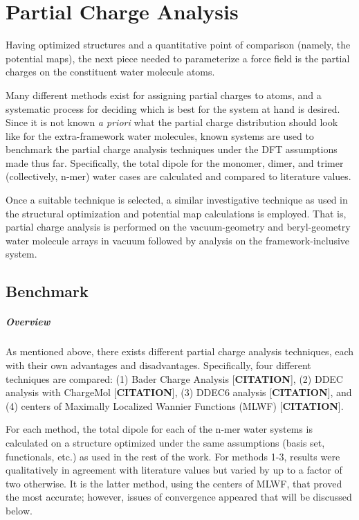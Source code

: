 \chapter{Partial Charge Analysis}
\label{ch:part_char}

Having optimized structures and a quantitative point of comparison (namely, the potential maps), the next piece needed to parameterize a force field is the partial charges on the constituent water molecule atoms. 

Many different methods exist for assigning partial charges to atoms, and a systematic process for deciding which is best for the system at hand is desired. Since it is not known \textit{a priori} what the partial charge distribution should look like for the extra-framework water molecules, known systems are used to benchmark the partial charge analysis techniques under the DFT assumptions made thus far. Specifically, the total dipole for the monomer, dimer, and trimer (collectively, n-mer) water cases are calculated and compared to literature values. 

Once a suitable technique is selected, a similar investigative technique as used in the structural optimization and potential map calculations is employed. That is, partial charge analysis is performed on the vacuum-geometry and beryl-geometry water molecule arrays in vacuum followed by analysis on the framework-inclusive system. 

    \section{Benchmark}
    \label{sec:benchmark}
    
    \paragraph{Overview} As mentioned above, there exists different partial charge analysis techniques, each with their own advantages and disadvantages. Specifically, four different techniques are compared: (1) Bader Charge Analysis [\textbf{CITATION}], (2) DDEC analysis with ChargeMol [\textbf{CITATION}], (3) DDEC6 analysis [\textbf{CITATION}], and (4) centers of Maximally Localized Wannier Functions (MLWF) [\textbf{CITATION}]. 
    
    For each method, the total dipole for each of the n-mer water systems is calculated on a structure optimized under the same assumptions (basis set, functionals, etc.) as used in the rest of the work. For methods 1-3, results were qualitatively in agreement with literature values but varied by up to a factor of two otherwise. It is the latter method, using the centers of MLWF, that proved the most accurate; however, issues of convergence appeared that will be discussed below.
    
